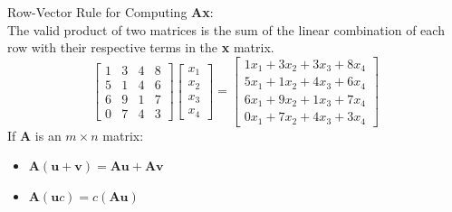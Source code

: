 \documentclass[nobib]{tufte-handout}
\begin{document}
Row-Vector Rule for Computing \textbf{Ax}:\\
The valid product of two matrices is the sum of the linear combination of each row with their respective terms in the \textbf{x} matrix.\\
\begin{equation*}
    \begin{bmatrix}
        1 & 3 & 4 & 8 \\
        5 & 1 & 4 & 6 \\
        6 & 9 & 1 & 7 \\
        0 & 7 & 4 & 3
    \end{bmatrix}
    \begin{bmatrix}
        x_1 \\
        x_2 \\
        x_3 \\
        x_4
    \end{bmatrix} =
    \begin{bmatrix}
        1x_1+3x_2+3x_3+8x_4 \\
        5x_1+1x_2+4x_3+6x_4 \\
        6x_1+9x_2+1x_3+7x_4 \\
        0x_1+7x_2+4x_3+3x_4
    \end{bmatrix}
\end{equation*}
If \textbf{A} is an $m\times n$ matrix:\
\begin{itemize}
    \item $\mathbf{A(u+v)=Au+Av}$
    \item $\mathbf{A}(\mathbf{u}c) = c(\mathbf{Au})$
\end{itemize}
\end{document}
